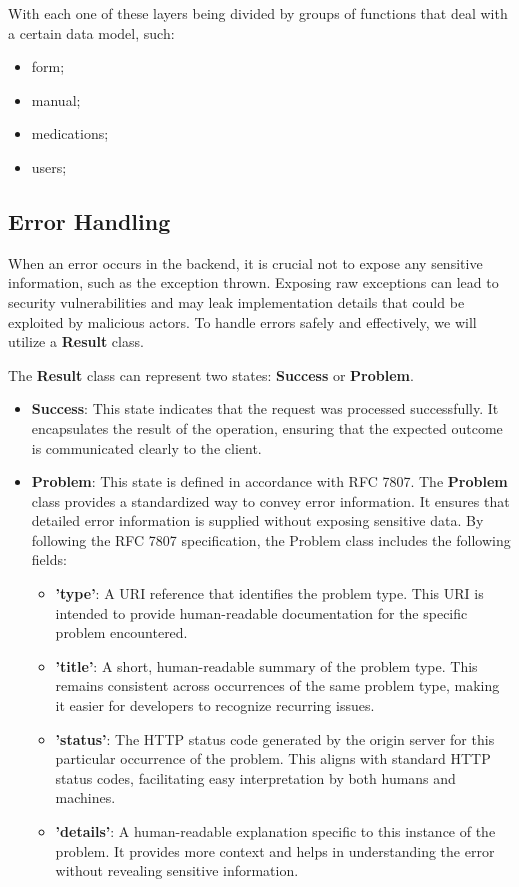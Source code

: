 With each one of these layers being divided by groups of functions that deal with a certain data model, such:
\begin{itemize}
	\item form;
	\item manual;
	\item medications;
	\item users;
\end{itemize}

\subsection{Error Handling}

When an error occurs in the backend, it is crucial not to expose any sensitive information, such as the exception thrown. Exposing raw exceptions can lead to security vulnerabilities and may leak implementation details that could be exploited by malicious actors. To handle errors safely and effectively, we will utilize a \textbf{Result} class.

The \textbf{Result} class can represent two states: \textbf{Success} or \textbf{Problem}.
\begin{itemize}
	\item \textbf{Success}: This state indicates that the request was processed successfully. It encapsulates the result of the operation, ensuring that the expected outcome is communicated clearly to the client.
	\item \textbf{Problem}: This state is defined in accordance with RFC 7807\cite{rfc7807}. The \textbf{Problem} class provides a standardized way to convey error information. It ensures that detailed error information is supplied without exposing sensitive data. By following the RFC 7807 specification, the Problem class includes the following fields:
	\begin{itemize}
		\item \textbf{'type'}: A URI reference that identifies the problem type. This URI is intended to provide human-readable documentation for the specific problem encountered.
		\item \textbf{'title'}: A short, human-readable summary of the problem type. This remains consistent across occurrences of the same problem type, making it easier for developers to recognize recurring issues.
		\item \textbf{'status'}:  The HTTP status code generated by the origin server for this particular occurrence of the problem. This aligns with standard HTTP status codes, facilitating easy interpretation by both humans and machines.
		\item \textbf{'details'}: A human-readable explanation specific to this instance of the problem. It provides more context and helps in understanding the error without revealing sensitive information.
	\end{itemize}
\end{itemize}

